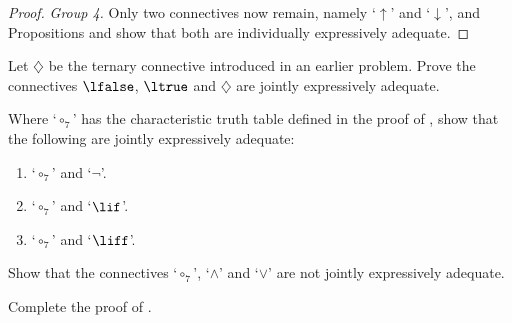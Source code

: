 \documentclass[../../../include/open-logic-section]{subfiles}
\begin{document}
\begin{thm}
\begin{proof}
		\emph{Group 4.} Only two connectives now remain, namely `$\uparrow$' and `$\downarrow$', and 	Propositions  and  show that both are individually expressively adequate.
		\end{proof}
	\end{thm}

\begin{prob}
	Let \( \diamondsuit \) be the ternary connective introduced in an earlier problem. %
	Prove the connectives \( \lfalse \), \( \ltrue \) and \( \diamondsuit \) are jointly expressively adequate.
\end{prob}

\begin{prob}
 Where `$\circ_7$' has the characteristic truth table defined in the proof of , show that the following are jointly expressively adequate:
	\begin{enumerate}
		\item `$\circ_7$' and `$\lnot$'. %
		\item `$\circ_7$' and `$\lif$'. %
		\item `$\circ_7$' and `$\liff$'. %
	\end{enumerate}
\end{prob}

\begin{prob}
Show that the connectives `$\circ_7$', `$\land$' and `$\lor$' are not jointly expressively adequate.\\
\end{prob}

\begin{prob}
Complete the proof of .
\end{prob}

 
\end{document}

